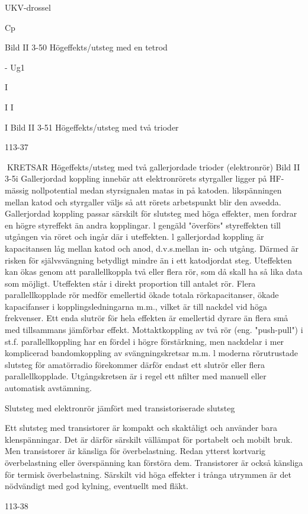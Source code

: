 \documentclass[a4paper,twoside,twocolumn,openright]{book}
\begin{document}
{{{{{{UKV-drossel

Cp

Bild II 3-50 Högeffekts/utsteg med en tetrod

- Ug1

I

I I

I
Bild II 3-51 Högeffekts/utsteg med två trioder

113-37

KRETSAR
Högeffekts/utsteg med två gallerjordade trioder (elektronrör)
Bild II 3-5i
Gallerjordad koppling innebär att elektronrörets styrgaller ligger på HF-mässig nollpotential medan styrsignalen matas in på
katoden. likspänningen mellan katod och
styrgaller väljs så att rörets arbetspunkt blir
den avsedda.
Gallerjordad koppling passar särskilt för
slutsteg med höga effekter, men fordrar en
högre styreffekt än andra kopplingar. l gengäld "överförs" styreffekten till utgången via
röret och ingår där i uteffekten. l gallerjordad
koppling är kapacitansen låg mellan katod
och anod, d.v.s.mellan in- och utgång. Därmed är risken för självsvängning betydligt
mindre än i ett katodjordat steg.
Uteffekten kan ökas genom att parallellkoppla två eller flera rör, som då skall ha så
lika data som möjligt. Uteffekten står i direkt
proportion till antalet rör.
Flera parallellkopplade rör medför emellertid ökade totala rörkapacitanser, ökade
kapacifanser i kopplingsledningarna m.m.,
vilket är till nackdel vid höga frekvenser.
Ett enda slutrör för hela effekten är emellertid dyrare än flera små med tillsammans
jämförbar effekt. Mottaktkoppling av två rör
(eng. "push-pull") i st.f. parallellkoppling har
en fördel i högre förstärkning, men nackdelar i mer komplicerad bandomkoppling av
svängningskretsar m.m. l moderna rörutrustade slutsteg för amatörradio förekommer
därför endast ett slutrör eller flera parallellkopplade. Utgångskretsen är i regel ett nfilter med manuell eller automatisk avstämning.

Slutsteg med elektronrör jämfört med
transistoriserade slutsteg

Ett slutsteg med transistorer är kompakt och
skaktåligt och använder bara klenspänningar. Det är därför särskilt vällämpat för portabelt och mobilt bruk.
Men transistorer är känsliga för överbelastning. Redan ytterst kortvarig överbelastning eller överspänning kan förstöra dem.
Transistorer är också känsliga för termisk
överbelastning. Särskilt vid höga effekter i
trånga utrymmen är det nödvändigt med god
kylning, eventuellt med fläkt.

113-38

}}}}}}
\end{document}

